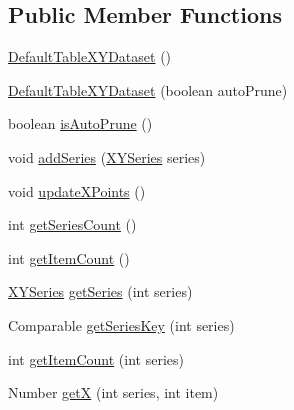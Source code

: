 \subsection*{Public Member Functions}
\begin{DoxyCompactItemize}
\item 
\mbox{\hyperlink{classorg_1_1jfree_1_1data_1_1xy_1_1_default_table_x_y_dataset_a920475f41b44d4b7eaf50d2267a013a9}{Default\+Table\+X\+Y\+Dataset}} ()
\item 
\mbox{\hyperlink{classorg_1_1jfree_1_1data_1_1xy_1_1_default_table_x_y_dataset_af447e61c11bb8b2184d3b8765ec75471}{Default\+Table\+X\+Y\+Dataset}} (boolean auto\+Prune)
\item 
boolean \mbox{\hyperlink{classorg_1_1jfree_1_1data_1_1xy_1_1_default_table_x_y_dataset_acdc186a6e59480f2f5902ee0c346ef43}{is\+Auto\+Prune}} ()
\item 
void \mbox{\hyperlink{classorg_1_1jfree_1_1data_1_1xy_1_1_default_table_x_y_dataset_a16f4ab104b2bf8233387ed0ead6b6487}{add\+Series}} (\mbox{\hyperlink{classorg_1_1jfree_1_1data_1_1xy_1_1_x_y_series}{X\+Y\+Series}} series)
\item 
void \mbox{\hyperlink{classorg_1_1jfree_1_1data_1_1xy_1_1_default_table_x_y_dataset_a56df8680d9a9e6642f18b19c4076dfab}{update\+X\+Points}} ()
\item 
int \mbox{\hyperlink{classorg_1_1jfree_1_1data_1_1xy_1_1_default_table_x_y_dataset_aa774ddd90265f11dede12b8bd31f44e7}{get\+Series\+Count}} ()
\item 
int \mbox{\hyperlink{classorg_1_1jfree_1_1data_1_1xy_1_1_default_table_x_y_dataset_a6f40c4ca3cfcf021f6be3ffd1978ba82}{get\+Item\+Count}} ()
\item 
\mbox{\hyperlink{classorg_1_1jfree_1_1data_1_1xy_1_1_x_y_series}{X\+Y\+Series}} \mbox{\hyperlink{classorg_1_1jfree_1_1data_1_1xy_1_1_default_table_x_y_dataset_aafd5c4cbe5af1eb0f7a6a73fe1407c6a}{get\+Series}} (int series)
\item 
Comparable \mbox{\hyperlink{classorg_1_1jfree_1_1data_1_1xy_1_1_default_table_x_y_dataset_a9490a0483fb491f814d37ed04c96d02b}{get\+Series\+Key}} (int series)
\item 
int \mbox{\hyperlink{classorg_1_1jfree_1_1data_1_1xy_1_1_default_table_x_y_dataset_a04eb2509a27d4e1707a64ea260710849}{get\+Item\+Count}} (int series)
\item 
Number \mbox{\hyperlink{classorg_1_1jfree_1_1data_1_1xy_1_1_default_table_x_y_dataset_ab2d943baa055ad2ba480f27d0293a0f8}{getX}} (int series, int item)
\item 

\end{DoxyCompactItemize}
